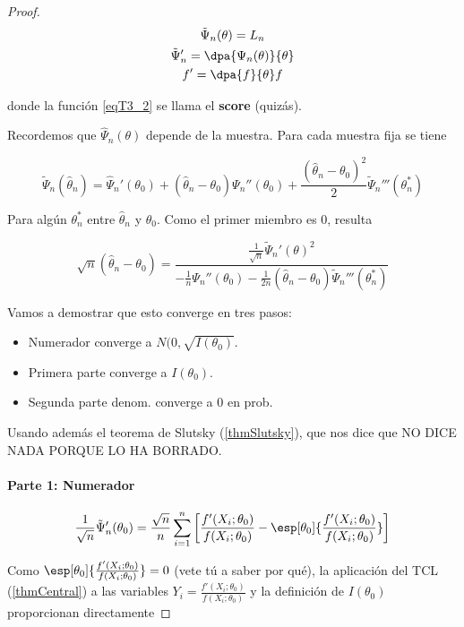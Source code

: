 \documentclass{apuntes}
\begin{document}
\begin{proof}

\begin{gather}
 \tilde\Psi_n(\theta) = L_n  \\
 \tilde\Psi_n' = \dpa{\Psi_n(\theta)}{\theta} \label{eqT3_2} \\
 f' = \dpa{f}{\theta}f
 \end{gather}
 
 donde la función \ref{eqT3_2} se llama el \textbf{score} (quizás).
 
 Recordemos que $\hat\Psi_n(\theta)$ depende de la muestra. Para cada muestra fija se tiene
 
 \[ \tilde\Psi_n(\hat\theta_n) = \hat\Psi_n'(\theta_0) + (\hat\theta_n-\theta_0)\Psi_n''(\theta_0) + \frac{\left(\hat\theta_n-\theta_0\right)^2}{2}\tilde\Psi_n'''(\theta_n^\ast) \]

Para algún $\theta_n^\ast$ entre $\hat\theta_ n$ y $\theta_0$. Como el primer miembro es 0, resulta

\[ \sqrt{n}\left(\hat\theta_n-\theta_0\right) = \frac{\frac{1}{\sqrt{n}}\tilde\Psi_n'(\theta)^2}{-\frac{1}{n}\Psi_n''(\theta_0) - \frac{1}{2n}\left(\hat\theta_n-\theta_0\right)\tilde\Psi_n'''(\theta_n^\ast)} \]

Vamos a demostrar que esto converge en tres pasos:

\begin{itemize}
\item Numerador converge a $N(0,\sqrt{I(\theta_0)}$.
\item Primera parte converge a $I(\theta_0)$.
\item Segunda parte denom. converge a 0 en prob.
\end{itemize}

Usando además el teorema de Slutsky (\ref{thmSlutsky}), que nos dice que NO DICE NADA PORQUE LO HA BORRADO.

\paragraph{Parte 1: Numerador}

\[ \frac{1}{\sqrt{n}}\tilde\Psi_n'(\theta_0) = \frac{\sqrt{n}}{n}\sum_{i=1}^n \left[\frac{f'(X_i;\theta_0)}{f(X_i;\theta_0)} - \esp[\theta_0]{\frac{f'(X_i;\theta_0)}{f(X_i;\theta_0)}}\right] \]

Como $\esp[\theta_0]{\frac{f'(X_i;\theta_0)}{f(X_i;\theta_0)}} = 0$ (vete tú a saber por qué), la aplicación del TCL (\ref{thmCentral}) a las variables $Y_i = \frac{f'(X_i;\theta_0)}{f(X_i;\theta_0)}$ y la definición de $I(\theta_0)$ proporcionan directamente


\end{proof}
\end{document}
